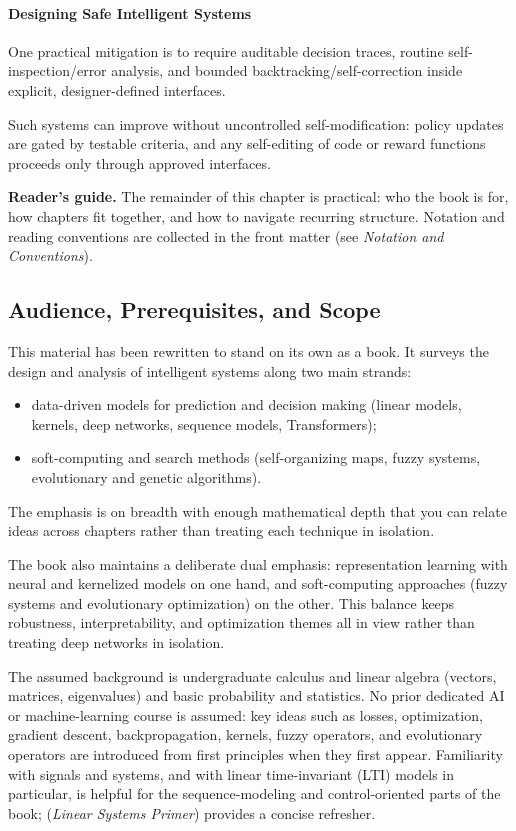 \paragraph{Designing Safe Intelligent Systems}

One practical mitigation is to require auditable decision traces, routine self-inspection/error analysis, and bounded backtracking/self-correction inside explicit, designer-defined interfaces.

\noindent Such systems can improve without uncontrolled self-modification: policy updates are gated by testable criteria, and any self-editing of code or reward functions proceeds only through approved interfaces.

\bigskip
\noindent\textbf{Reader's guide.} The remainder of this chapter is practical: who the book is for, how chapters fit together, and how to navigate recurring structure. Notation and reading conventions are collected in the front matter (see \emph{Notation and Conventions}).

\subsection{Audience, Prerequisites, and Scope}
\label{sec:intro_audience_prerequisites_and_scope}

This material has been rewritten to stand on its own as a book. It surveys the design and analysis of intelligent systems along two main strands:
\begin{itemize}
    \item data\hyp{}driven models for prediction and decision making (linear models, kernels, deep
    networks, sequence models, Transformers);
    \item soft\hyp{}computing and search methods (self\hyp{}organizing maps, fuzzy systems, evolutionary and
    genetic algorithms).
\end{itemize}
The emphasis is on breadth with enough mathematical depth that you can relate ideas across chapters rather than treating each technique in isolation.

The book also maintains a deliberate dual emphasis: representation learning with neural and kernelized models on one hand, and soft\hyp{}computing approaches (fuzzy systems and evolutionary optimization) on the other. This balance keeps robustness, interpretability, and optimization themes all in view rather than treating deep networks in isolation.

    The assumed background is undergraduate calculus and linear algebra (vectors, matrices, eigenvalues) and basic probability and statistics. No prior dedicated AI or machine\hyp{}learning course is assumed: key ideas such as losses, optimization, gradient descent, backpropagation, kernels, fuzzy operators, and evolutionary operators are introduced from first principles when they first appear. Familiarity with signals and systems, and with linear time-invariant (LTI) models in particular, is helpful for the sequence-modeling and control-oriented parts of the book;  (\emph{Linear Systems Primer}) provides a concise refresher.

